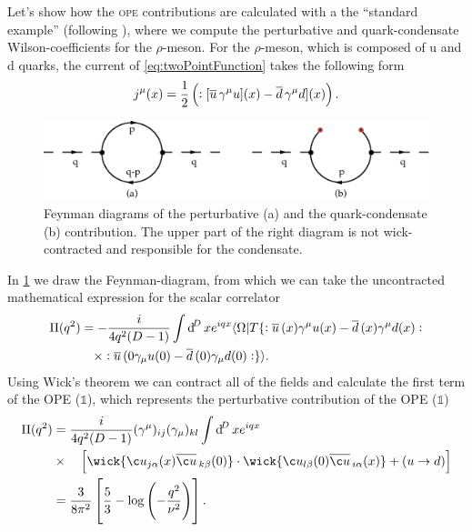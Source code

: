 \documentclass[../../index.tex]{subfiles}
\begin{document}
Let's show how the \textsc{ope} contributions are calculated with a the ``standard
example'' (following \cite{Pascual1984}), where we compute the perturbative and
quark-condensate Wilson-coefficients for the $\rho$-meson. For the $\rho$-meson,
which is composed of u and d quarks, the current of \cref{eq:twoPointFunction}
takes the following form
\begin{equation}
  j^\mu(x) = \frac{1}{2}\left(:[\overline{u}\, \gamma^\mu u](x) - \overline{d}\, \gamma^\mu d](x)\right).
\end{equation}
\begin{figure}
  \centering
  \includegraphics[width=\textwidth]{./images/condensateFeynmanDiagram.eps}
  \caption{Feynman diagrams of the perturbative (a) and the quark-condensate (b)
    contribution. The upper part of the right diagram is not wick-contracted and
    responsible for the condensate.}
  \label{fig:OPEFeynmanDiagram}
\end{figure}
In \cref{fig:OPEFeynmanDiagram} we draw the Feynman-diagram, from which we can
take the uncontracted mathematical expression for the scalar correlator
\begin{equation}
  \begin{split}
    \Pi(q^2) &= - \frac{i}{4 q^2 (D -1)} \int \dif^D x e^{iqx} \langle \Omega \vert T \{:\anti{u}(x) \gamma^\mu u(x) - \anti{d}(x) \gamma^\mu d(x): \\
    &\quad\times :\anti{u}(0 \gamma_\mu u(0) - \anti{d}(0)\gamma_\mu d(0): \}
    \rangle.
  \end{split}
\end{equation}
Using Wick's theorem we can contract all of the fields and calculate the first
term of the OPE ($\mathbb{1}$), which represents the perturbative contribution
of the OPE ($\mathbb{1}$)
\begin{equation}
  \begin{split}
    \Pi(q^2) &= \frac{i}{4q^2(D-1)} (\gamma^\mu)_{ij} (\gamma_\mu)_{kl} \int \dif^D x e^{iqx} \\
    &\times\quad\left[ \wick{ \c u_{j \alpha}(x) \anti{\c u}_{k \beta}(0)} \cdot
      \wick{\c u_{l \beta}(0) \anti{\c u}_{i \alpha}(x)} + (u \to d)
    \right] \\
    &= \frac{3}{8\pi^2} \left[ \frac{5}{3} - \log\left( -\frac{q^2}{\nu^2}
      \right) \right].
  \end{split}
\end{equation}
\end{document}

